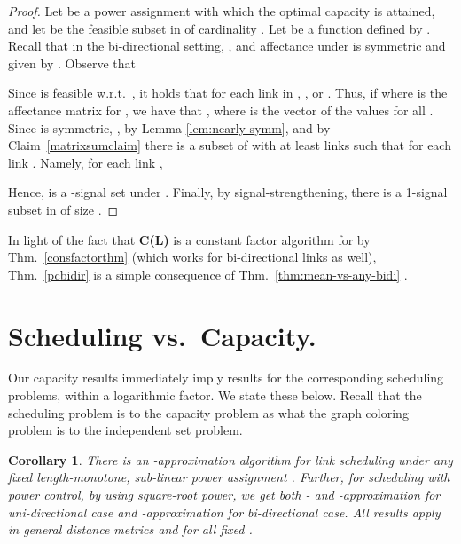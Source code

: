 \documentclass[11pt]{amsart}
\newcommand{\alg}[1]{\textbf{#1}}
\newcounter{foo}
\newtheorem{corollary}[foo]{Corollary}
\begin{document}
\begin{proof}
Let  be a power assignment with which the optimal capacity
 is attained, and let  be the feasible subset in 
of cardinality .
Let  be a function defined by 
.
Recall that in the bi-directional setting,
, and 
affectance under  is symmetric and given by
.
Observe that 

Since  is feasible w.r.t.\ ,
it holds that for each link  in , 
, or
.
Thus, if  where  is the affectance matrix for ,
we have that , where 
 is the vector of the values  for all .
Since  is symmetric, 
, by Lemma \ref{lem:nearly-symm},
and by Claim~\ref{matrixsumclaim} there is a subset  of  with at least  links 
such that  for each link .
Namely, for each link ,

Hence,  is a -signal set under .
Finally, by signal-strengthening, there is a 1-signal subset  in
 of size .
\end{proof}

In light of the fact that \alg{C(L)} is a constant factor algorithm for   by Thm.~\ref{consfactorthm} (which works for bi-directional links as well), Thm.~\ref{pcbidir}
is a simple consequence of Thm.~\ref{thm:mean-vs-any-bidi}
.




\iffalse
As a direct consequence, we also obtain a  approximation for scheduling, improving on a
-factor of \cite{FKRV09} and -factor of \cite{FV09}. In the following section, we will show that this is in fact tight,
that is, this is the best approximation factor possible via oblivious power.
\fi





\section{Scheduling vs.\ Capacity.}

Our capacity results immediately imply results for the corresponding
scheduling problems, within a logarithmic factor. We state these
below. Recall that the scheduling problem is to the capacity problem
as what the graph coloring problem is to the independent set problem.

\begin{corollary}
There is an -approximation algorithm for link scheduling 
under any fixed length-monotone,
sub-linear power assignment .
Further, for scheduling with power control, by using square-root
power, we get both - and 
-approximation for
uni-directional case and -approximation for bi-directional case.
All results apply in general distance metrics and for all fixed .
\end{corollary}
\end{document}
